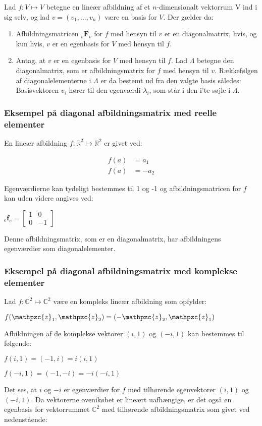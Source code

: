 \documentclass{article}
\newcommand{\cent}[1]{\begin{center}#1\end{center}}
\newcommand{\mAlign}[1]{\begin{align*}#1\end{align*}}
\newcommand{\afb}[3]{\ensuremath{_#1 \textbf{#2}_#3}}
\newcommand{\smallMatrix}[4]{\ensuremath{\begin{bmatrix}
			#1 & #2 \\
			#3 & #4
\end{bmatrix}}}
\newcommand{\script}[1]{\mathpzc{#1}}
\begin{document}
	Lad $ f : V \mapsto V $ betegne en lineær afbildning af et $n$-dimensionalt vektorrum V ind i sig selv, og lad $ v=(v_1,…,v_n)$ være en basis for $V$. Der gælder da:
	
	\begin{enumerate}
		\item Afbildningsmatricen $\afb{v}{F}{v}$ for $f$ med hensyn til $v$ er en diagonalmatrix, hvis, og kun hvis, $v$ er en egenbasis for $V$ med hensyn til $f$.
		\item Antag, at $v$ er en egenbasis for $V$ med hensyn til $f$. Lad $\Lambda$ betegne den diagonalmatrix, som er afbildningsmatrix for $f$ med hensyn til $v$. Rækkefølgen af diagonalelementerne i $\Lambda$ er da bestemt ud fra den valgte basis således: Basisvektoren $v_i$ hører til den egenværdi $\lambda_i$, som står i den i’te søjle i $\Lambda$.
	\end{enumerate}
	
	\subsubsection{Eksempel på diagonal afbildningsmatrix med reelle elementer}
	
	En lineær afbildning $ f : \mathbb{R}^2 \mapsto \mathbb{R}^2 $ er givet ved:
	
	\mAlign{f(a)&=a_1 \\ f(a)&=-a_2}
	
	Egenværdierne kan tydeligt bestemmes til 1 og -1 og afbildningsmatricen for $ f $ kan uden videre angives ved:
	
	\cent{ $ \afb{e}{f}{e} = \smallMatrix{1}{0}{0}{-1}$}
	
	Denne afbildningsmatrix, som er en diagonalmatrix, har afbildningens egenværdier som diagonalelementer.
	
	\subsubsection*{Eksempel på diagonal afbildningsmatrix med komplekse elementer}
	Lad $ f : \mathbb{C}^2 \mapsto \mathbb{C}^2 $ være en kompleks lineær afbildning som opfylder:
	\cent{$ f(\script{z}_1,\script{z}_2) = (-\script{z}_2,\script{z}_1) $}
	
	Afbildningen af de komplekse vektorer $(i,1)$ og $(-i,1)$ kan bestemmes til følgende:
	
	\cent{$ f(i,1)=(-1,i)=i(i,1) $}
	\cent{$ f(-i,1)=(-1,-i)=-i(-i,1) $}
	
	Det ses, at $i$ og $-i$ er egenværdier for $f$ med tilhørende egenvektorer $(i,1)$ og $(-i,1)$.  Da vektorerne ovenikøbet er lineært uafhængige, er det også en egenbasis for vektorrummet $\mathbb{C}^2$ med tilhørende afbildningsmatrix som givet ved nedenstående:
	
\end{document}
